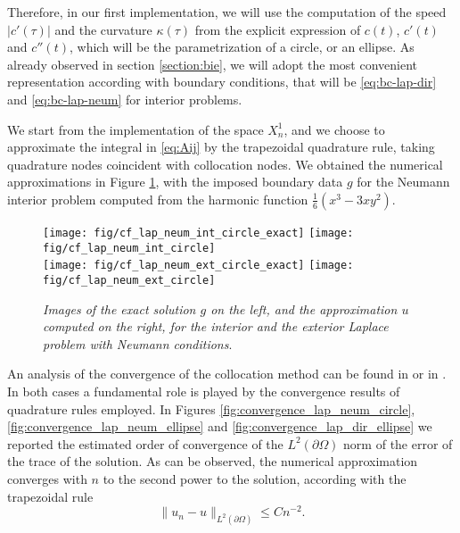 \documentclass[10pt, a4paper]{article} %
\numberwithin{equation}{section}
\theoremstyle{definition}
\theoremstyle{plain}
\theoremstyle{plain}
\theoremstyle{plain}
\theoremstyle{plain}
\theoremstyle{plain}
\theoremstyle{plain}
\theoremstyle{plain}
\theoremstyle{plain}
\begin{document}
Therefore, in our first implementation, we will use the computation of the
speed $|c'(\tau)|$ and the curvature $\kappa(\tau)$ from the explicit expression
of $c(t)$, $c'(t)$ and $c''(t)$, which will be the parametrization of a circle, or an ellipse.
As already observed in section \ref{section:bie}, we will adopt the most convenient representation according 
with boundary conditions, that will be \eqref{eq:bc-lap-dir} and \eqref{eq:bc-lap-neum} for interior problems. 
\par
We start from the implementation of the space $X^1_n$, and
we choose to approximate the integral in \eqref{eq:Aij} by the trapezoidal quadrature rule, 
taking quadrature nodes coincident with collocation nodes.
We obtained the numerical approximations in Figure \ref{fig:cf_lap_neum_circle}, with the
imposed boundary data $g$ for the Neumann interior problem 
computed from the harmonic function $\tfrac{1}{6}(x^3 - 3xy^2)$.
\par

\begin{center}
\begin{figure}
{
\texttt{[image: fig/cf\_lap\_neum\_int\_circle\_exact]}
}
{
\texttt{[image: fig/cf\_lap\_neum\_int\_circle]}
}
\\
{
\texttt{[image: fig/cf\_lap\_neum\_ext\_circle\_exact]}
}
{
\texttt{[image: fig/cf\_lap\_neum\_ext\_circle]}
}
\caption{\emph{Images of the exact solution $g$ on the left, and the approximation $u$ computed on the right,
for the interior and the exterior Laplace problem with Neumann conditions}.}
\label{fig:cf_lap_neum_circle}
\end{figure}
\end{center}

An analysis of the convergence of the collocation method can be found in 
\cite{chen-zhou:book} or in \cite{kress:book}.
In both cases a fundamental role is played by the convergence results of quadrature rules employed.
In Figures \ref{fig:convergence_lap_neum_circle}, \ref{fig:convergence_lap_neum_ellipse} and \ref{fig:convergence_lap_dir_ellipse} 
we reported the estimated order of convergence of the $L^2(\partial\Omega)$ norm of the
error of the trace of the solution. As can be observed, the numerical approximation 
converges with $n$ to the second power to the solution, according with the trapezoidal rule
\begin{equation}
 \|u_n - u\|_{L^2(\partial\Omega)}\leq Cn^{-2}.
\end{equation}
\end{document}
